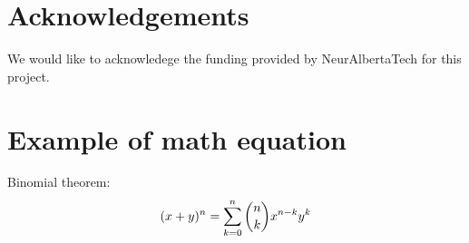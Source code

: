 \documentclass[10pt]{cai}
\begin{document}
\section*{Acknowledgements}
We would like to acknowledege the funding provided by NeurAlbertaTech for this project.


\appendix

\section{Example of math equation }
Binomial theorem: \cite{abramowitz1948handbook}
\begin{equation}
(x+y)^n=\sum_{\substack{k=0}}^{n}\dbinom{n}{k}x^{n-k}y^k
\end{equation}


\printbibliography[heading=subbibintoc]
\end{document}
